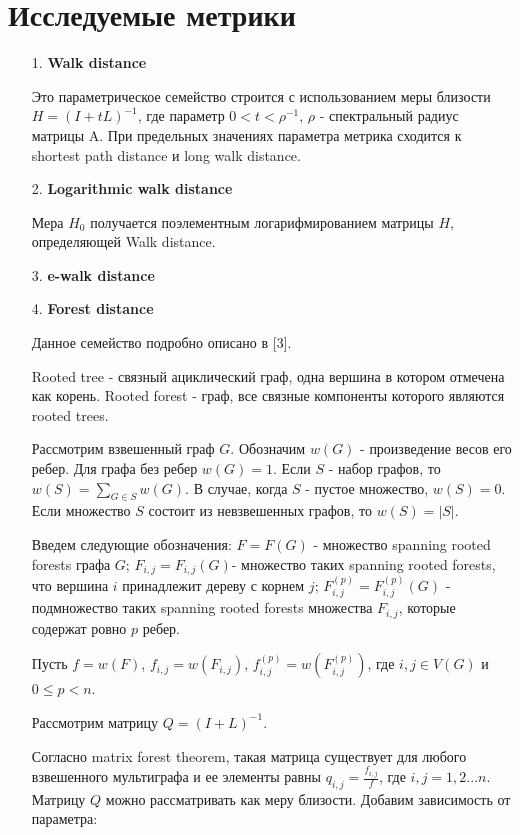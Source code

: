 \section{Исследуемые метрики} \label{sect1_3}
\begin{itemize}
\item[1.] \textbf{Walk distance}

Это параметрическое семейство строится с использованием меры близости $H = (I + tL)^{-1}$, где параметр $0 < t < \rho ^{-1}$, $\rho$ - спектральный радиус матрицы A. При предельных значениях параметра метрика сходится к shortest path distance и long walk distance. 

\item[2.] \textbf{Logarithmic walk distance}

Мера $H_0$ получается поэлементным логарифмированием матрицы $H$, определяющей Walk distance.

\item[3.] \textbf{e-walk distance}

\item[4.] \textbf{Forest distance}

Данное семейство подробно описано в [3].

Rooted tree - связный ациклический граф, одна вершина в котором отмечена как корень. Rooted forest - граф, все связные компоненты которого являются rooted trees.

Рассмотрим взвешенный граф $G$. Обозначим $w(G)$ - произведение весов его ребер. Для графа без ребер $w(G) = 1$. Если $S$ - набор графов, то $w(S) = \sum_{G \in S} w(G)$.  В случае, когда $S$ - пустое множество, $w(S) = 0$. Если множество $S$ состоит из невзвешенных графов, то $w(S) = |S|$.

Введем следующие обозначения: $F = F(G)$ - множество spanning rooted forests графа $G$; $F_{i,j} = F_{i,j}(G)$- множество таких spanning rooted forests, что вершина $i$ принадлежит дереву с корнем $j$; $F_{i,j}^{(p)} = F_{i,j}^{(p)}(G)$ - подмножество таких spanning rooted forests множества $F_{i,j}$, которые содержат ровно $p$ ребер.

Пусть $f = w(F)$, $f_{i,j} = w(F_{i,j})$, $f_{i,j}^{(p)} = w(F_{i,j}^{(p)})$, где $i,j \in V(G)$ и $0 \le p < n$.

Рассмотрим матрицу $Q = (I + L)^{-1}$.

Согласно matrix forest theorem, такая матрица существует для любого взвешенного мультиграфа и ее элементы равны $q_{i,j} = \frac {f_{i,j}}{f}$, где $i,j = 1,2...n$. Матрицу $Q$ можно рассматривать как меру близости. Добавим зависимость от параметра:


\end{itemize}
